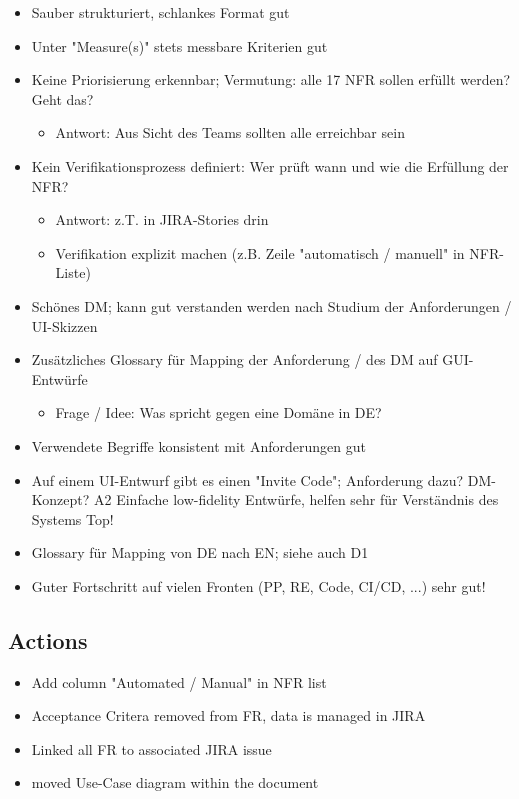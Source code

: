\begin{itemize}
\begin{itemize}
    \end{itemize}
    \item Sauber strukturiert, schlankes Format \textrightarrow gut
    \item Unter "Measure(s)" stets messbare Kriterien \textrightarrow gut
    \item Keine Priorisierung erkennbar; Vermutung: alle 17 NFR sollen erfüllt werden? Geht das?
    \begin{itemize}
        \item Antwort: Aus Sicht des Teams sollten alle erreichbar sein
    \end{itemize}
    \item Kein Verifikationsprozess definiert: Wer prüft wann und wie die Erfüllung der NFR?
    \begin{itemize}
        \item Antwort: z.T. in JIRA-Stories drin
        \item Verifikation explizit machen (z.B. Zeile "automatisch / manuell" in NFR-Liste)
    \end{itemize}
    \item Schönes DM; kann gut verstanden werden nach Studium der Anforderungen / UI-Skizzen
    \item Zusätzliches Glossary für Mapping der Anforderung / des DM auf GUI-Entwürfe
    \begin{itemize}
        \item Frage / Idee: Was spricht gegen eine Domäne in DE?
    \end{itemize}
    \item Verwendete Begriffe konsistent mit Anforderungen \textrightarrow gut
    \item Auf einem UI-Entwurf gibt es einen "Invite Code"; Anforderung dazu? DM-Konzept? A2 Einfache low-fidelity Entwürfe, helfen sehr für Verständnis des Systems \textrightarrow Top!
    \item Glossary für Mapping von DE nach EN; siehe auch D1
    \item Guter Fortschritt auf vielen Fronten (PP, RE, Code, CI/CD, ...) \textrightarrow sehr gut!
\end{itemize}

\subsection{Actions}

\begin{itemize}
    \item Add column "Automated / Manual" in NFR list
    \item Acceptance Critera removed from FR, data is managed in JIRA
    \item Linked all FR to associated JIRA issue
    \item moved Use-Case diagram within the document
\end{itemize}

